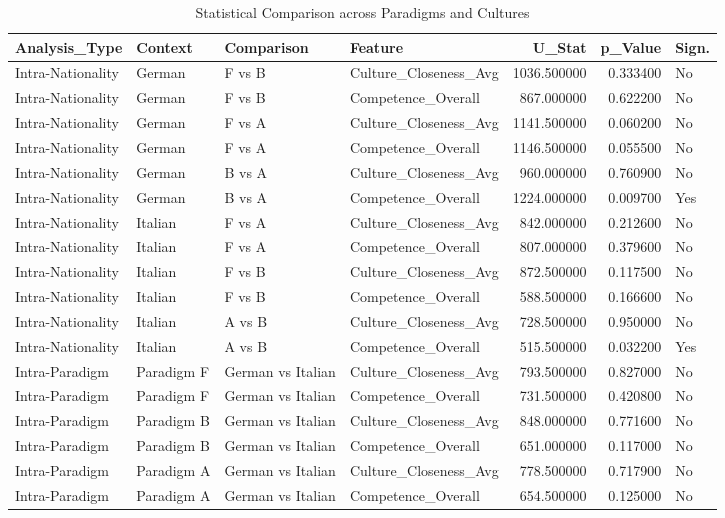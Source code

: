\begin{table}
\caption{Statistical Comparison across Paradigms and Cultures}
\label{tab:interaction_analysis}
\begin{tabular}{llllrrl}
\toprule
Analysis_Type & Context & Comparison & Feature & U_Stat & p_Value & Sign. \\
\midrule
Intra-Nationality & German & F vs B & Culture_Closeness_Avg & 1036.500000 & 0.333400 & No \\
Intra-Nationality & German & F vs B & Competence_Overall & 867.000000 & 0.622200 & No \\
Intra-Nationality & German & F vs A & Culture_Closeness_Avg & 1141.500000 & 0.060200 & No \\
Intra-Nationality & German & F vs A & Competence_Overall & 1146.500000 & 0.055500 & No \\
Intra-Nationality & German & B vs A & Culture_Closeness_Avg & 960.000000 & 0.760900 & No \\
Intra-Nationality & German & B vs A & Competence_Overall & 1224.000000 & 0.009700 & Yes \\
Intra-Nationality & Italian & F vs A & Culture_Closeness_Avg & 842.000000 & 0.212600 & No \\
Intra-Nationality & Italian & F vs A & Competence_Overall & 807.000000 & 0.379600 & No \\
Intra-Nationality & Italian & F vs B & Culture_Closeness_Avg & 872.500000 & 0.117500 & No \\
Intra-Nationality & Italian & F vs B & Competence_Overall & 588.500000 & 0.166600 & No \\
Intra-Nationality & Italian & A vs B & Culture_Closeness_Avg & 728.500000 & 0.950000 & No \\
Intra-Nationality & Italian & A vs B & Competence_Overall & 515.500000 & 0.032200 & Yes \\
Intra-Paradigm & Paradigm F & German vs Italian & Culture_Closeness_Avg & 793.500000 & 0.827000 & No \\
Intra-Paradigm & Paradigm F & German vs Italian & Competence_Overall & 731.500000 & 0.420800 & No \\
Intra-Paradigm & Paradigm B & German vs Italian & Culture_Closeness_Avg & 848.000000 & 0.771600 & No \\
Intra-Paradigm & Paradigm B & German vs Italian & Competence_Overall & 651.000000 & 0.117000 & No \\
Intra-Paradigm & Paradigm A & German vs Italian & Culture_Closeness_Avg & 778.500000 & 0.717900 & No \\
Intra-Paradigm & Paradigm A & German vs Italian & Competence_Overall & 654.500000 & 0.125000 & No \\
\bottomrule
\end{tabular}
\end{table}
